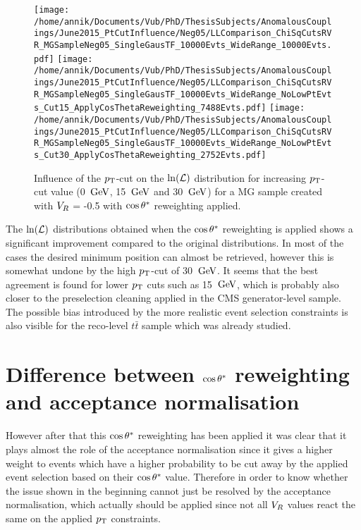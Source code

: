 \begin{figure}[h!t]
 \centering
 \texttt{[image: /home/annik/Documents/Vub/PhD/ThesisSubjects/AnomalousCouplings/June2015\_PtCutInfluence/Neg05/LLComparison\_ChiSqCutsRVR\_MGSampleNeg05\_SingleGausTF\_10000Evts\_WideRange\_10000Evts.pdf]}
 \texttt{[image: /home/annik/Documents/Vub/PhD/ThesisSubjects/AnomalousCouplings/June2015\_PtCutInfluence/Neg05/LLComparison\_ChiSqCutsRVR\_MGSampleNeg05\_SingleGausTF\_10000Evts\_WideRange\_NoLowPtEvts\_Cut15\_ApplyCosThetaReweighting\_7488Evts.pdf]}
 \texttt{[image: /home/annik/Documents/Vub/PhD/ThesisSubjects/AnomalousCouplings/June2015\_PtCutInfluence/Neg05/LLComparison\_ChiSqCutsRVR\_MGSampleNeg05\_SingleGausTF\_10000Evts\_WideRange\_NoLowPtEvts\_Cut30\_ApplyCosThetaReweighting\_2752Evts.pdf]}
 \caption{Influence of the $p_{\textrm T}$-cut on the $\ln(\mathcal{L})$ distribution for increasing $p_{\textrm T}$-cut value (0 $\, \mathrm{GeV}$, 15 $\, \mathrm{GeV}$ and 30 $\, \mathrm{GeV}$) for a MG sample created with $V_{R}$ = -0.5 with $\cos \theta^{*}$ reweighting applied.}
 \label{fig::CosThetaNeg05}
\end{figure}
 
The $\ln(\mathcal{L})$ distributions obtained when the $\cos \theta^{*}$ reweighting is applied shows a significant improvement compared to the original distributions. In most of the cases the desired minimum position can almost be retrieved, however this is somewhat undone by the high $p_{\textrm T}$-cut of 30 $\, \mathrm{GeV}$. It seems that the best agreement is found for lower $p_{\textrm T}$ cuts such as 15 $\, \mathrm{GeV}$, which is probably also closer to the preselection cleaning applied in the CMS generator-level sample. The possible bias introduced by the more realistic event selection constraints is also visible for the reco-level $t\bar{t}$ sample which was already studied.

\section{Difference between $\cos \theta^{*}$ reweighting and acceptance normalisation}
However after that this $\cos \theta^{*}$ reweighting has been applied it was clear that it plays almost the role of the acceptance normalisation since it gives a higher weight to events which have a higher probability to be cut away by the applied event selection based on their $\cos \theta^{*}$ value. Therefore in order to know whether the issue shown in the beginning cannot just be resolved by the acceptance normalisation, which actually should be applied since not all $V_{R}$ values react the same on the applied $p_{\textrm T}$ constraints. 
\\

